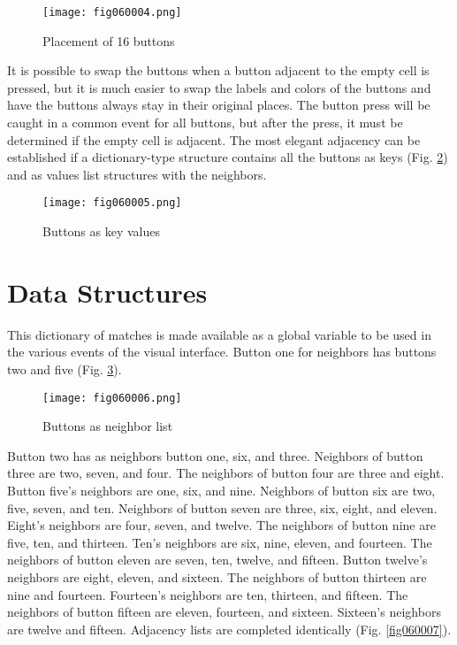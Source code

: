 \begin{figure}[H]
   \centering
   \texttt{[image: fig060004.png]}
   \caption{Placement of 16 buttons}
\label{fig060004}
\end{figure}

It is possible to swap the buttons when a button adjacent to the empty cell is pressed, but it is much easier to swap the labels and colors of the buttons and have the buttons always stay in their original places. The button press will be caught in a common event for all buttons, but after the press, it must be determined if the empty cell is adjacent. The most elegant adjacency can be established if a dictionary-type structure contains all the buttons as keys (Fig. \ref{fig060005}) and as values list structures with the neighbors.

\begin{figure}[H]
   \centering
   \texttt{[image: fig060005.png]}
   \caption{Buttons as key values}
\label{fig060005}
\end{figure}

\section{Data Structures}

This dictionary of matches is made available as a global variable to be used in the various events of the visual interface. Button one for neighbors has buttons two and five (Fig. \ref{fig060006}).

\begin{figure}[H]
   \centering
   \texttt{[image: fig060006.png]}
   \caption{Buttons as neighbor list}
\label{fig060006}
\end{figure}

Button two has as neighbors button one, six, and three. Neighbors of button three are two, seven, and four. The neighbors of button four are three and eight. Button five's neighbors are one, six, and nine. Neighbors of button six are two, five, seven, and ten. Neighbors of button seven are three, six, eight, and eleven. Eight's neighbors are four, seven, and twelve. The neighbors of button nine are five, ten, and thirteen. Ten's neighbors are six, nine, eleven, and fourteen. The neighbors of button eleven are seven, ten, twelve, and fifteen. Button twelve's neighbors are eight, eleven, and sixteen. The neighbors of button thirteen are nine and fourteen. Fourteen's neighbors are ten, thirteen, and fifteen. The neighbors of button fifteen are eleven, fourteen, and sixteen. Sixteen's neighbors are twelve and fifteen. Adjacency lists are completed identically (Fig. \ref{fig060007}).

